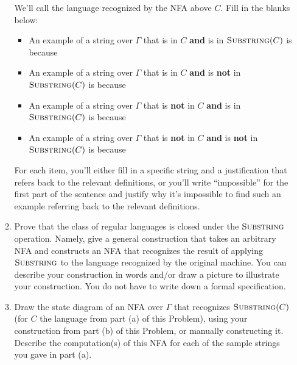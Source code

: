 \begin{enumerate}
\begin{enumerate}
\begin{center}
\end{center}
We'll call the language recognized by the NFA above $C$.
Fill in the blanks below: 
\begin{itemize}
    \item An example of a string over $\Gamma$ that is in $C$
    {\bf and} is in $\textsc{Substring}(C)$ is \underline{\phantom{\hspace{1in}}} because 
    \underline{\phantom{\hspace{1in}}}
    \item An example of a string over $\Gamma$ that is in $C$
    {\bf and} is {\bf not} in $\textsc{Substring}(C)$ is \underline{\phantom{\hspace{1in}}} because 
    \underline{\phantom{\hspace{1in}}}
    \item An example of a string over $\Gamma$ that is {\bf not} in $C$
    {\bf and} is in $\textsc{Substring}(C)$ is \underline{\phantom{\hspace{1in}}} because 
    \underline{\phantom{\hspace{1in}}}
    \item An example of a string over $\Gamma$ that is {\bf not} in $C$
    {\bf and} is {\bf not} in $\textsc{Substring}(C)$ is \underline{\phantom{\hspace{1in}}} because 
    \underline{\phantom{\hspace{1in}}}
\end{itemize}
For each item, you'll either fill in a specific string 
and a justification that refers back to the relevant 
definitions, or you'll write ``impossible'' for the first 
part of the sentence and justify why it's impossible to find such 
an example referring back to the relevant definitions.
\item\gradeComplete Prove 
that the class of regular languages is closed under the $\textsc{Substring}$ operation. Namely, give a general construction 
that takes an arbitrary NFA and constructs
 an NFA that recognizes the result of applying $\textsc{Substring}$
 to the language recognized by the original machine. 
You can describe your construction in words and/or
draw a picture to illustrate your construction.
You do not have to write down a formal specification.

\item\gradeComplete Draw the state diagram of an 
NFA over $\Gamma$ that recognizes $\textsc{Substring}(C)$ (for 
$C$ the language from part (a) of this Problem), using
your construction from part (b) of this Problem, or manually
constructing it. 
Describe the computation(s) of this NFA for each of the 
sample strings you gave in part (a).
\end{enumerate}


\end{enumerate}
